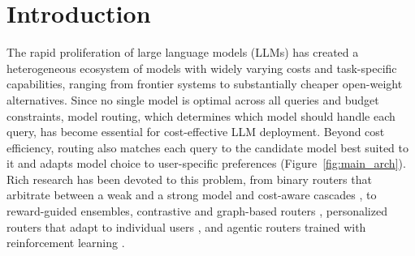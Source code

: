 \section{Introduction}
\label{sec:intro}

The rapid proliferation of large language models (LLMs) has created a heterogeneous ecosystem of models with widely varying costs and task-specific capabilities, ranging from frontier systems to substantially cheaper open-weight alternatives. Since no single model is optimal across all queries and budget constraints, model routing, which determines which model should handle each query, has become essential for cost-effective LLM deployment. Beyond cost efficiency, routing also matches each query to the candidate model best suited to it and adapts model choice to user-specific preferences (Figure~\ref{fig:main_arch}). 
Rich research has been devoted to this problem, from binary routers that arbitrate between a weak and a strong model \citep{ding2024hybrid, ong2024routellm} and cost-aware cascades \citep{chen2023frugalgpt, aggarwal2024automix}, to reward-guided ensembles, contrastive and graph-based routers \citep{chen2024routerdc, feng2024graphrouter}, personalized routers that adapt to individual users \citep{xie2025gmtrouter, dai2025personalizedrouter}, and agentic routers trained with reinforcement learning \citep{zhang2025router, feng2026graphplanner}.

